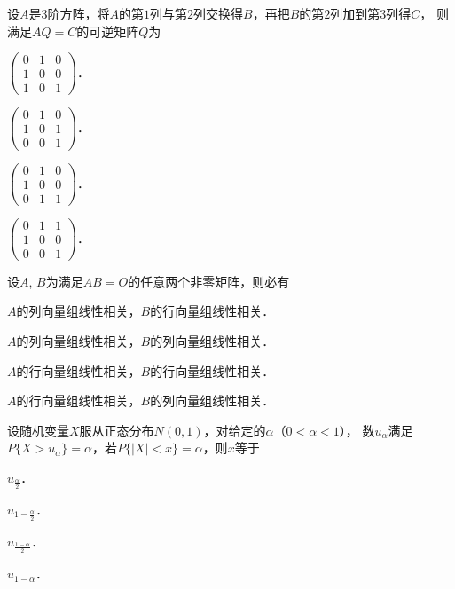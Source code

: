 \documentclass[plain,noanswer,medmath]{../../template/jnuexam}
\begin{document}
\begin{problem}
设$A$是$3$阶方阵，将$A$的第$1$列与第$2$列交换得$B$，再把$B$的第$2$列加到第$3$列得$C$，
则满足$AQ = C$的可逆矩阵$Q$为\pickout{}
\begin{abcd}
\item $\begin{pmatrix}
  0 & 1 & 0 \\
  1 & 0 & 0 \\
  1 & 0 & 1
\end{pmatrix}$．
\item $\begin{pmatrix}
  0 & 1 & 0 \\
  1 & 0 & 1 \\
  0 & 0 & 1
\end{pmatrix}$．
\item $\begin{pmatrix}
  0 & 1 & 0 \\
  1 & 0 & 0 \\
  0 & 1 & 1
\end{pmatrix}$．
\item $\begin{pmatrix}
  0 & 1 & 1 \\
  1 & 0 & 0 \\
  0 & 0 & 1
\end{pmatrix}$．
\end{abcd}
\end{problem}


\begin{problem}
设$A$, $B$为满足$AB = O$的任意两个非零矩阵，则必有\pickout{}
\begin{abcd}
\item $A$的列向量组线性相关，$B$的行向量组线性相关．
\item $A$的列向量组线性相关，$B$的列向量组线性相关．
\item $A$的行向量组线性相关，$B$的行向量组线性相关．
\item $A$的行向量组线性相关，$B$的列向量组线性相关．
\end{abcd}
\end{problem}


\begin{problem}
设随机变量$X$服从正态分布$N(0,1)$，对给定的$\alpha$（$0 < \alpha < 1$），
数$u_{\alpha}$满足$P\{X > u_{\alpha}\} = \alpha$，若$P\{|X| < x\} = \alpha$，则$x$等于\pickout{}
\begin{abcd}
\item $u_{\frac{\alpha}{2}}$．
\item $u_{1 - \frac{\alpha}{2}}$．
\item $u_{\frac{1 - \alpha}{2}}$．
\item $u_{1 - \alpha}$．
\end{abcd}
\end{problem}
\end{document}
